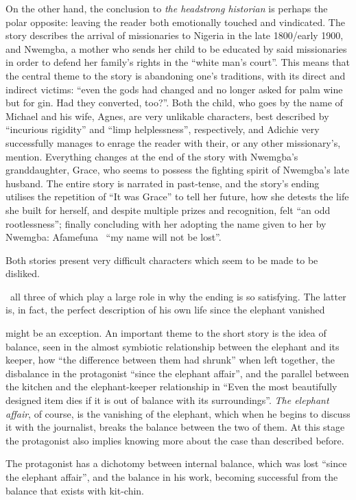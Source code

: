 \documentclass[12pt,a4paper]{article}
\begin{document}
On the other hand, the conclusion to \textit{the headstrong historian} is perhaps the polar opposite: leaving the reader both emotionally touched and vindicated. The story describes the arrival of missionaries to Nigeria in the late 1800/early 1900, and Nwemgba, a mother who sends her child to be educated by said missionaries in order to defend her family's rights in the ``white man's court''. This means that the central theme to the story is abandoning one's traditions, with its direct and indirect victims: ``even the gods had changed and no longer asked for palm wine but for gin. Had they converted, too?''. Both the child, who goes by the name of Michael and his wife, Agnes, are very unlikable characters, best described by ``incurious rigidity'' and ``limp helplessness'', respectively, and Adichie very successfully manages to enrage the reader with their, or any other missionary's, mention. Everything changes at the end of the story with Nwemgba's granddaughter, Grace, who seems to possess the fighting spirit of Nwemgba's late husband. The entire story is narrated in past-tense, and the story's ending utilises the repetition of ``It was Grace'' to tell her future, how she detests the life she built for herself, and despite multiple prizes and recognition, felt ``an odd rootlessness''; finally concluding with her adopting the name given to her by Nwemgba: Afamefuna \textendash\ ``my name will not be lost''. 

Both stories present very difficult characters which seem to be made to be disliked.


\textendash\ all three of which play a large role in why the ending is so satisfying. The latter is, in fact, the perfect description of his own life since the elephant vanished

might be an exception. An important theme to the short story is the idea of balance, seen in the almost symbiotic relationship between the elephant and its keeper, how ``the difference between them had shrunk'' when left together, the disbalance in the protagonist ``since the elephant affair'', and the parallel between the kitchen and the elephant-keeper relationship in ``Even the most beautifully designed item dies if it is out of balance with its surroundings''. \textit{The elephant affair}, of course, is the vanishing of the elephant, which when he begins to discuss it with the journalist, breaks the balance between the two of them. At this stage the protagonist also implies knowing more about the case than described before.

The protagonist has a dichotomy between internal balance, which was lost ``since the elephant affair'', and the balance in his work, becoming successful from the balance that exists with kit-chin.
\end{document}
